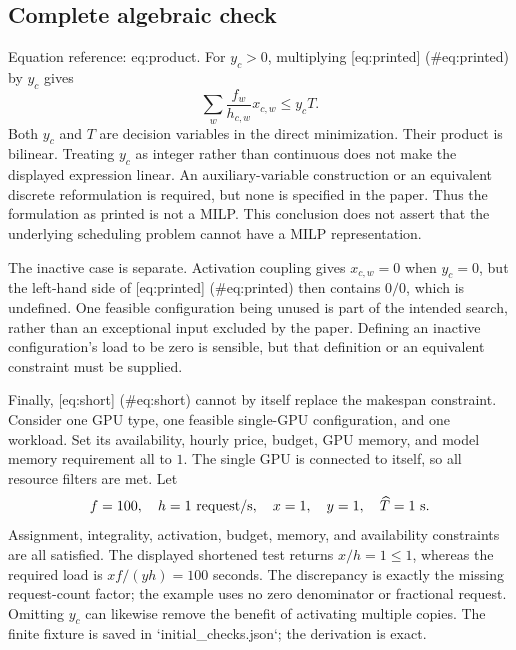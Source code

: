 \documentclass[10pt]{article}
\begin{document}
\subsection*{Complete algebraic check}
Equation reference: eq:product. For \(y_c>0\), multiplying [eq:printed] (\#eq:printed) by \(y_c\) gives \[
 \sum_w \frac{f_w}{h_{c,w}}x_{c,w}\leq y_cT .\] Both \(y_c\) and \(T\) are decision variables in the direct minimization. Their product is bilinear. Treating \(y_c\) as integer rather than continuous does not make the displayed expression linear. An auxiliary-variable construction or an equivalent discrete reformulation is required, but none is specified in the paper. Thus the formulation as printed is not a MILP. This conclusion does not assert that the underlying scheduling problem cannot have a MILP representation.\par
The inactive case is separate. Activation coupling gives \(x_{c,w}=0\) when \(y_c=0\), but the left-hand side of [eq:printed] (\#eq:printed) then contains \(0/0\), which is undefined. One feasible configuration being unused is part of the intended search, rather than an exceptional input excluded by the paper. Defining an inactive configuration’s load to be zero is sensible, but that definition or an equivalent constraint must be supplied.\par
Finally, [eq:short] (\#eq:short) cannot by itself replace the makespan constraint. Consider one GPU type, one feasible single-GPU configuration, and one workload. Set its availability, hourly price, budget, GPU memory, and model memory requirement all to \(1\). The single GPU is connected to itself, so all resource filters are met. Let \[f=100,\quad h=1\ {\rm request/s},\quad x=1,\quad y=1,
 \quad \widehat T=1\ {\rm s}.\] Assignment, integrality, activation, budget, memory, and availability constraints are all satisfied. The displayed shortened test returns \(x/h=1\leq1\), whereas the required load is \(xf/(yh)=100\) seconds. The discrepancy is exactly the missing request-count factor; the example uses no zero denominator or fractional request. Omitting \(y_c\) can likewise remove the benefit of activating multiple copies. The finite fixture is saved in `initial\_checks.json`; the derivation is exact.\par
\end{document}
